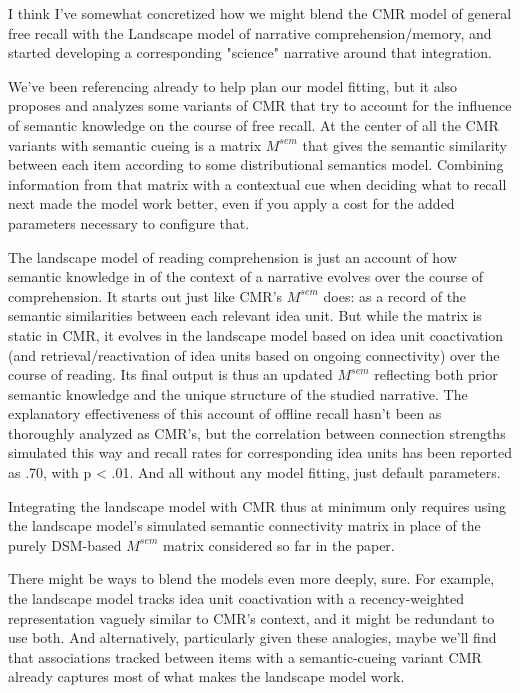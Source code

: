 I think I've somewhat concretized how we might blend the CMR model of general free recall with the Landscape model of narrative comprehension/memory, and started developing a corresponding "science" narrative around that integration.

We've been referencing \citet{morton2016predictive} already to help plan our model fitting, but it also proposes and analyzes some variants of CMR that try to account for the influence of semantic knowledge on the course of free recall. At the center of all the CMR variants with semantic cueing is a matrix $M^{sem}$ that gives the semantic similarity between each item according to some distributional semantics model. Combining information from that matrix with a contextual cue when deciding what to recall next made the model work better, even if you apply a cost for the added parameters necessary to configure that.

The landscape model of reading comprehension is just an account of how semantic knowledge in of the context of a narrative evolves over the course of comprehension. It starts out just like CMR's $M^{sem}$ does: as a record of the semantic similarities between each relevant idea unit. But while the matrix is static in CMR, it evolves in the landscape model based on idea unit coactivation (and retrieval/reactivation of idea units based on ongoing connectivity) over the course of reading. Its final output is thus an updated $M^{sem}$ reflecting both prior semantic knowledge and the unique structure of the studied narrative. The explanatory effectiveness of this account of offline recall hasn't been as thoroughly analyzed as CMR's, but the correlation between connection strengths simulated this way and recall rates for corresponding idea units has been reported as .70, with p < .01. And all without any model fitting, just default parameters.

Integrating the landscape model with CMR thus at minimum only requires using the landscape model's simulated semantic connectivity matrix in place of the purely DSM-based $M^{sem}$ matrix considered so far in the \citet{morton2016predictive} paper.

There might be ways to blend the models even more deeply, sure. For example, the landscape model tracks idea unit coactivation with a recency-weighted representation vaguely similar to CMR's context, and it might be redundant to use both. And alternatively, particularly given these analogies, maybe we'll find that associations tracked between items with a semantic-cueing variant CMR already captures most of what makes the landscape model work.

